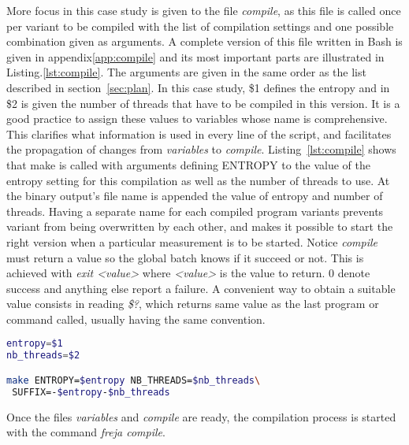 More focus in this case study is given to the file \emph{compile}, as this file is called once per variant to be compiled with the list of compilation settings and one possible combination given as arguments. A complete version of this file written in Bash is given in appendix\ref{app:compile} and its most important parts are illustrated in Listing.\ref{lst:compile}. The arguments are given in the same order as the list described in section~\ref{sec:plan}. In this case study, \$1 defines the entropy and in \$2 is given the number of threads that have to be compiled in this version. It is a good practice to assign these values to variables whose name is comprehensive. This clarifies what information is used in every line of the script, and facilitates the propagation of changes from \emph{variables} to \emph{compile}. Listing~\ref{lst:compile} shows that make is called with arguments defining {ENTROPY} to the value of the entropy setting for this compilation as well as the number of threads to use. At the binary output's file name is appended the value of entropy and number of threads. Having a separate name for each compiled program variants prevents variant from being overwritten by each other, and makes it possible to start the right version when a particular measurement is to be started. Notice \emph{compile} must return a value so the global batch knows if it succeed or not. This is achieved with \emph{exit <value>} where \emph{<value>} is the value to return. 0 denote success and anything else report a failure. A convenient way to obtain a suitable value consists in reading \emph{\$?}, which returns same value as the last program or command called, usually having the same convention.

\begin{lstlisting}[caption={\emph{compile} catches the values of compilations settings and passes them to make.},label={lst:compile},language=bash]
entropy=$1
nb_threads=$2

make ENTROPY=$entropy NB_THREADS=$nb_threads\
 SUFFIX=-$entropy-$nb_threads
\end{lstlisting}

Once the files \emph{variables} and \emph{compile} are ready, the compilation process is started with the command \emph{freja compile}.

